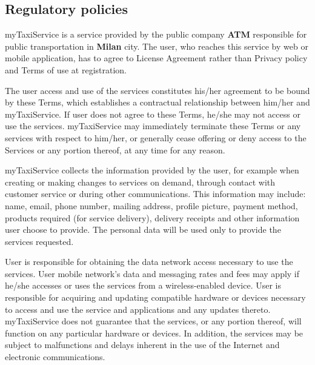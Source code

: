 \subsection{Regulatory policies}
myTaxiService is a service provided by the public company \textbf{ATM} responsible for public transportation in \textbf{Milan} city. The user, who reaches this service by web or mobile application, has to agree to License Agreement rather than Privacy policy and Terms of use at registration.

The user access and use of the services constitutes his/her agreement to be bound by these Terms, which establishes a contractual relationship between him/her and myTaxiService. If user does not agree to these Terms, he/she may not access or use the services. myTaxiService may immediately terminate these Terms or any services with respect to him/her, or generally cease offering or deny access to the Services or any portion thereof, at any time for any reason.

myTaxiService collects the information provided by the user, for example when creating or making changes to services on demand, through contact with customer service or during other communications. This information may include: name, email, phone number, mailing address, profile picture, payment method, products required (for service delivery), delivery receipts and other information user choose to provide. The personal data will be used only to provide the services requested.

User is responsible for obtaining the data network access necessary to use the services. User mobile network's data and messaging rates and fees may apply if he/she accesses or uses the services from a wireless-enabled device. User is responsible for acquiring and updating compatible hardware or devices necessary to access and use the service and applications and any updates thereto. myTaxiService does not guarantee that the services, or any portion thereof, will function on any particular hardware or devices. In addition, the services may be subject to malfunctions and delays inherent in the use of the Internet and electronic communications.

